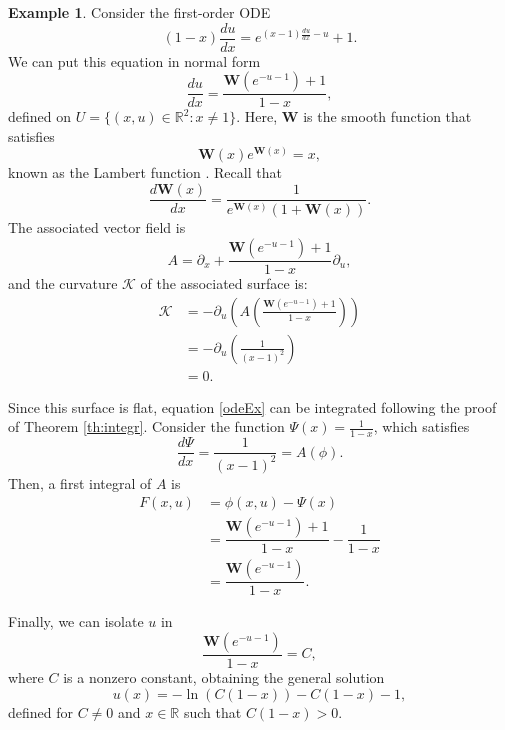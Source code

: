 \documentclass{article}
\theoremstyle{remark}
\theoremstyle{definition}
\newtheorem{example}[remark]{Example}
\begin{document}
\begin{example}
Consider the first-order ODE
\begin{equation}\label{odeEx}
    (1-x)\frac{du}{dx}=e^{(x-1)\frac{du}{dx}-u}+1.
\end{equation}
We can put this equation in normal form
$$
\dfrac{d u}{dx}=\dfrac{\mathbf W(e^{-u-1})+1}{1-x},
$$
defined on $U=\{(x,u)\in \mathbb R^2:x\neq 1\}$. Here, $\mathbf W$ is the smooth function that satisfies
$$
\mathbf W(x)e^{\mathbf W(x)}=x,
$$
known as the Lambert function \cite{handbookfunctions}. Recall that 
$$
\dfrac{d\mathbf W(x)}{dx}=\frac{1}{e^{\mathbf W(x)}\left(1+\mathbf W(x)\right)}.
$$
The associated vector field is 
$$
A=\partial_x+\dfrac{\mathbf W(e^{-u-1})+1}{1-x}\partial_u,
$$
and the curvature $\mathcal{K}$ of the associated surface is:
\begin{align*}
\mathcal{K} & = -\partial_u\left(A\left(\frac{\mathbf{W}\left(e^{-u-1}\right) + 1}{1 - x}\right)\right) \\
  & = -\partial_u\left(\frac{1}{(x-1)^2}\right) \\
  & = 0.
\end{align*}


Since this surface is flat, equation \eqref{odeEx} can be integrated following the proof of Theorem \ref{th:integr}. Consider the function $\Psi(x)=\frac{1}{1-x}$, which satisfies 
$$
\frac{d\Psi}{dx}=\frac{1}{(x-1)^2}=A\left(\phi\right).
$$ 
Then, a first integral of $A$ is
\begin{align*}
    F(x,u)&=\phi(x, u) - \Psi(x) \\
    &= \dfrac{\mathbf W(e^{-u-1})+1}{1-x}-\dfrac{1}{1-x}\\
    &=\dfrac{\mathbf{W}(e^{-u-1})}{1-x}.
\end{align*}

Finally, we can isolate $u$ in 
$$
\dfrac{\mathbf{W}(e^{-u-1})}{1-x}=C,
$$
where $C$ is a nonzero constant, obtaining the general solution 
$$
u(x)=-\ln(C(1-x))-C(1-x)-1,
$$
defined for $C\neq 0$ and $x\in \mathbb R$ such that $C(1-x)>0$.
\end{example}



\end{document}
